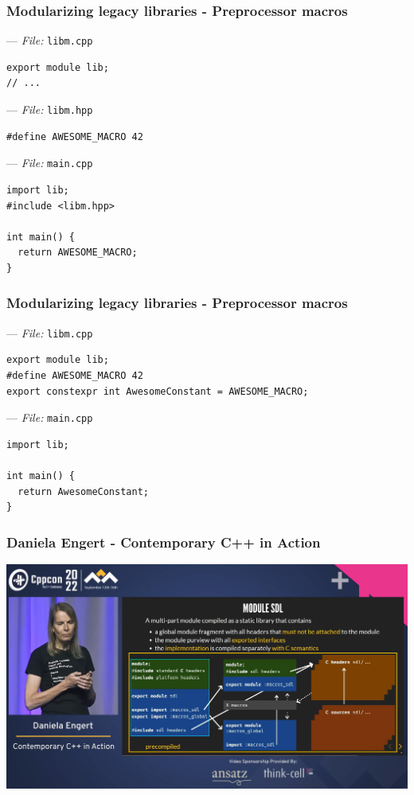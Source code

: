 \documentclass[aspectratio=169]{beamer}
\begin{document}
\begin{frame}[fragile]
  \frametitle{Modularizing legacy libraries - Preprocessor macros}
  
  --- \textit{File:} \texttt{libm.cpp}
  \begin{lstlisting}[style=cpp20]
export module lib;
// ...
  \end{lstlisting}
  
  --- \textit{File:} \texttt{libm.hpp}
    \begin{lstlisting}[style=cpp20]
#define AWESOME_MACRO 42
  \end{lstlisting}
  
  --- \textit{File:} \texttt{main.cpp}
  \begin{lstlisting}[style=cpp20]
import lib;
#include <libm.hpp>

int main() {
  return AWESOME_MACRO;
}
  \end{lstlisting}
\end{frame}


\begin{frame}[fragile]
  \frametitle{Modularizing legacy libraries - Preprocessor macros}
  
  --- \textit{File:} \texttt{libm.cpp}
  \begin{lstlisting}[style=cpp20]
export module lib;
#define AWESOME_MACRO 42
export constexpr int AwesomeConstant = AWESOME_MACRO;
  \end{lstlisting}
  
  --- \textit{File:} \texttt{main.cpp}
  \begin{lstlisting}[style=cpp20]
import lib;

int main() {
  return AwesomeConstant;
}
  \end{lstlisting}
\end{frame}

\begin{frame}
  \frametitle{Daniela Engert - Contemporary C++ in Action}
  \begin{center}
    \href{https://www.youtube.com/watch?v=yUIFdL3D0Vk}
    {\includegraphics[height=.8\textheight]{modulesgfx/engert_contemporary.jpg}}
  \end{center}
\end{frame}
\end{document}
